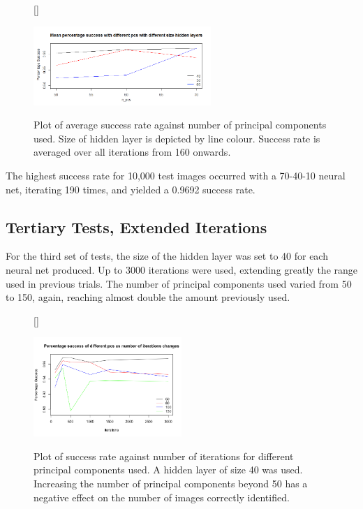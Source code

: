 \documentclass[11pt]{article} %
\begin{document}
\begin{figure}[htb!]
[\FBwidth]
{\caption{Plot of average success rate against number of principal components used. Size of hidden layer is depicted by line colour. Success rate is averaged over all iterations from 160 onwards.}\label{fig:ext_mean_pc_nnet}}
{\includegraphics[width=0.6\textwidth]{nnet_mean_diff_pcs_extended_it2.png}}
\end{figure}

The highest success rate for 10,000 test images occurred with a 70-40-10 neural net, iterating 190 times, and yielded a 0.9692 success rate. 

\subsection{Tertiary Tests, Extended Iterations}

For the third set of tests, the size of the hidden layer was set to 40 for each neural net produced. Up to 3000 iterations were used, extending greatly the range used in previous trials. The number of principal components used varied from 50 to 150, again, reaching almost double the amount previously used.


\begin{figure}[htb!]
[\FBwidth]
{\caption{Plot of success rate against number of iterations for different principal components used. A hidden layer of size 40 was used. Increasing the number of principal components beyond 50 has a negative effect on the number of images correctly identified. }\label{fig:superext_nnet}}
{\includegraphics[width=0.5\textwidth]{nn_superext.png}}
\end{figure}
\end{document}
